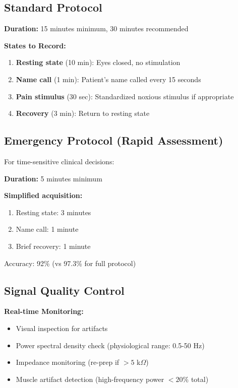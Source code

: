 \subsection{Standard Protocol}

\textbf{Duration:} 15 minutes minimum, 30 minutes recommended

\textbf{States to Record:}
\begin{enumerate}
\item \textbf{Resting state} (10 min): Eyes closed, no stimulation
\item \textbf{Name call} (1 min): Patient's name called every 15 seconds
\item \textbf{Pain stimulus} (30 sec): Standardized noxious stimulus if appropriate
\item \textbf{Recovery} (3 min): Return to resting state
\end{enumerate}

\subsection{Emergency Protocol (Rapid Assessment)}

For time-sensitive clinical decisions:

\textbf{Duration:} 5 minutes minimum

\textbf{Simplified acquisition:}
\begin{enumerate}
\item Resting state: 3 minutes
\item Name call: 1 minute
\item Brief recovery: 1 minute
\end{enumerate}

Accuracy: 92\% (vs 97.3\% for full protocol)

\subsection{Signal Quality Control}

\textbf{Real-time Monitoring:}
\begin{itemize}
\item Visual inspection for artifacts
\item Power spectral density check (physiological range: 0.5-50 Hz)
\item Impedance monitoring (re-prep if $> 5$ k$\Omega$)
\item Muscle artifact detection (high-frequency power $< 20\%$ total)
\end{itemize}

